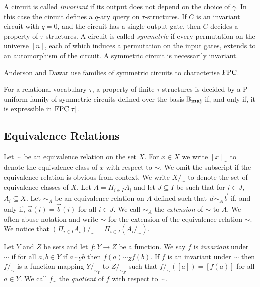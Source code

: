 \documentclass[../paper.tex]{subfiles}
\begin{document}
A circuit is called \emph{invariant} if its output does not depend on the choice
of $\gamma$. In this case the circuit defines a $q$-ary query on
$\tau$-structures. If $C$ is an invariant circuit with $q = 0$, and the circuit
has a single output gate, then $C$ decides a property of $\tau$-structures. A circuit
is called \emph{symmetric} if every permutation on the universe $[n]$, each of
which induces a permutation on the input gates, extends to an automorphism of
the circuit. A symmetric circuit is necessarily invariant.

Anderson and Dawar use families of symmetric circuits to characterise $\text{\upshape FPC}$.

\begin{thm}
  For a relational vocabulary $\tau$, a property of finite $\tau$-structures is
  decided by a P-uniform family of symmetric circuits defined over the basis
  $\mathbb{B}_{\text{\textbf{maj}}}$ if, and only if, it is expressible in $\text{\upshape FPC}[\tau]$.
\end{thm}

\subsection{Equivalence Relations}
Let $\sim$ be an equivalence relation on the set $X$. For $x \in X$ we write
$[x]_\sim$ to denote the equivalence class of $x$ with respect to $\sim$. We
omit the subscript if the equivalence relation is obvious from context. We write
$X/_{\sim}$ to denote the set of equivalence classes of $X$. Let $A = \Pi_{i \in
  I} A_i$ and let $J \subseteq I$ be such that for $i \in J$, $A_i \subseteq X$.
Let $\sim_A$ be an equivalence relation on $A$ defined such that $\vec{a} \sim_A
\vec{b}$ if, and only if, $\vec{a}(i) = \vec{b}(i)$ for all $i \in J$. We call
$\sim_A$ the \emph{extension} of $\sim$ to $A$. We often abuse notation and
write $\sim$ for the extension of the equivalence relation $\sim$. We notice
that $(\Pi_{i \in I} A_i) /_{\sim} = \Pi_{i \in I} (A_i /_\sim)$.

Let $Y$ and $Z$ be sets and let $f : Y \rightarrow Z$ be a function. We say $f$
is \emph{invariant} under $\sim$ if for all $a, b \in Y$ if $a \sim_Y b$ then
$f(a) \sim_Z f(b)$. If $f$ is an invariant under $\sim$ then $f /_{\sim}$ is a
function mapping $Y /_{\sim_Y} $ to $ Z /_{\sim_Z}$ such that $f /_{\sim} ([a]) =
[f(a)]$ for all $a \in Y$. We call $f_{\sim}$ the \emph{quotient} of $f$ with
respect to $\sim$.




\end{document}
